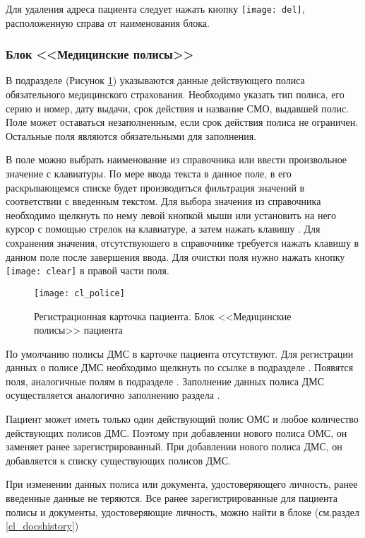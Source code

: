 {Для удаления адреса пациента следует нажать кнопку \texttt{[image: del]}, расположенную справа от наименования блока.
 
\subsubsection{Блок <<Медицинские полисы>>}
  
В подразделе  (Рисунок \ref{img_cl_police}) указываются данные действующего полиса обязательного медицинского страхования. Необходимо указать тип полиса, его серию и номер, дату выдачи, срок действия и название СМО, выдавшей полис. Поле  может оставаться незаполненным, если срок действия полиса не ограничен. Остальные поля являются обязательными для заполнения. 

В поле  можно выбрать наименование из справочника или ввести произвольное значение с клавиатуры. По мере ввода текста в данное поле, в его  раскрывающемся списке будет производиться фильтрация значений в соответствии с введенным текстом. Для выбора значения из справочника необходимо щелкнуть по нему левой кнопкой мыши или установить на него курсор с помощью стрелок на клавиатуре, а затем нажать клавишу . Для сохранения значения, отсутствуюшего в справочнике требуется нажать клавишу  в данном поле после завершения ввода. Для очистки поля нужно нажать кнопку \texttt{[image: clear]} в правой части поля.

\begin{figure}[ht]\centering
 \texttt{[image: cl\_police]}
 \caption{Регистрационная карточка пациента. Блок <<Медицинские полисы>> пациента}
 \label{img_cl_police}
\end{figure}  

По умолчанию полисы ДМС в карточке пациента отсутствуют. Для регистрации данных о полисе ДМС необходимо щелкнуть по ссылке  в подразделе . Появятся поля, аналогичные полям в подразделе . Заполнение данных полиса ДМС осуществляется аналогично заполнению раздела .

Пациент может иметь только один действующий полис ОМС и любое количество действующих полисов ДМС. Поэтому при добавлении нового полиса ОМС, он заменяет ранее зарегистрированный. При добавлении нового полиса ДМС, он добавляется к списку существующих полисов ДМС. 

\begin{prim}
При изменении данных полиса или документа, удостоверяющего личность, ранее введенные данные не теряются. Все ранее зарегистрированные для пациента полисы  и документы, удостоверяющие личность, можно найти в блоке  (см.раздел \ref{cl_docshistory})
\end{prim}

}
